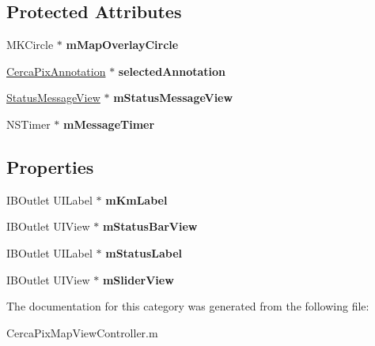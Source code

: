 \subsection*{Protected Attributes}
\begin{DoxyCompactItemize}
\item 
\hypertarget{category_cerca_pix_map_view_controller_07_08_a701672335c1db0545555573d83b87b6a}{M\-K\-Circle $\ast$ {\bfseries m\-Map\-Overlay\-Circle}}\label{category_cerca_pix_map_view_controller_07_08_a701672335c1db0545555573d83b87b6a}

\item 
\hypertarget{category_cerca_pix_map_view_controller_07_08_a5961d4f81741d668220a6c5bbf7f347b}{\hyperlink{interface_cerca_pix_annotation}{Cerca\-Pix\-Annotation} $\ast$ {\bfseries selected\-Annotation}}\label{category_cerca_pix_map_view_controller_07_08_a5961d4f81741d668220a6c5bbf7f347b}

\item 
\hypertarget{category_cerca_pix_map_view_controller_07_08_abbb7bb44b84cfcf846f76509b8199ebd}{\hyperlink{interface_status_message_view}{Status\-Message\-View} $\ast$ {\bfseries m\-Status\-Message\-View}}\label{category_cerca_pix_map_view_controller_07_08_abbb7bb44b84cfcf846f76509b8199ebd}

\item 
\hypertarget{category_cerca_pix_map_view_controller_07_08_a4239adb9120cccb2c5b75aedf5973fbc}{N\-S\-Timer $\ast$ {\bfseries m\-Message\-Timer}}\label{category_cerca_pix_map_view_controller_07_08_a4239adb9120cccb2c5b75aedf5973fbc}

\end{DoxyCompactItemize}
\subsection*{Properties}
\begin{DoxyCompactItemize}
\item 
\hypertarget{category_cerca_pix_map_view_controller_07_08_a0aa0b5199f22c7a1a4e86612c95c2b1a}{I\-B\-Outlet U\-I\-Label $\ast$ {\bfseries m\-Km\-Label}}\label{category_cerca_pix_map_view_controller_07_08_a0aa0b5199f22c7a1a4e86612c95c2b1a}

\item 
\hypertarget{category_cerca_pix_map_view_controller_07_08_a066c7e2abfdfa95f79f38be90e85db94}{I\-B\-Outlet U\-I\-View $\ast$ {\bfseries m\-Status\-Bar\-View}}\label{category_cerca_pix_map_view_controller_07_08_a066c7e2abfdfa95f79f38be90e85db94}

\item 
\hypertarget{category_cerca_pix_map_view_controller_07_08_a161dd74ce52682ea43306686b2702a4e}{I\-B\-Outlet U\-I\-Label $\ast$ {\bfseries m\-Status\-Label}}\label{category_cerca_pix_map_view_controller_07_08_a161dd74ce52682ea43306686b2702a4e}

\item 
\hypertarget{category_cerca_pix_map_view_controller_07_08_af569b2cb1016c20c511423ad955fef05}{I\-B\-Outlet U\-I\-View $\ast$ {\bfseries m\-Slider\-View}}\label{category_cerca_pix_map_view_controller_07_08_af569b2cb1016c20c511423ad955fef05}

\end{DoxyCompactItemize}


The documentation for this category was generated from the following file\-:\begin{DoxyCompactItemize}
\item 
Cerca\-Pix\-Map\-View\-Controller.\-m\end{DoxyCompactItemize}
